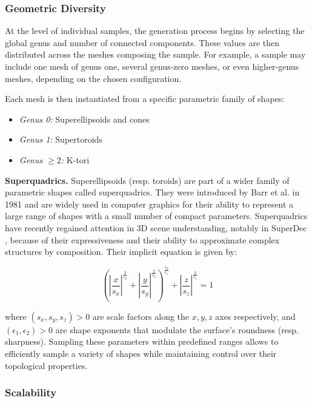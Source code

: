 \subsubsection{Geometric Diversity}
\label{sssec:sample-level-properties}

At the level of individual samples, the generation process begins by selecting the global genus and number of connected components. These values are then distributed across the meshes composing the sample. For example, a sample may include one mesh of genus one, several genus-zero meshes, or even higher-genus meshes, depending on the chosen configuration.

Each mesh is then instantiated from a specific parametric family of shapes:
\begin{itemize}
  \item \textit{Genus 0:} Superellipsoids and cones
  \item \textit{Genus 1:} Supertoroids
  \item \textit{Genus $\geq 2$:} K-tori
\end{itemize}

\textbf{Superquadrics.} Superellipsoids  (resp. toroids) are part of a wider family of parametric shapes called superquadrics. They were introduced by Barr et al. \cite{superquadrics} in 1981 and are widely used in computer graphics for their ability to represent a large range of shapes with a small number of compact parameters. Superquadrics have recently regained attention in 3D scene understanding, notably in SuperDec \cite{superdec}, because of their expressiveness and their ability to approximate complex structures by composition. Their implicit equation is given by:

\begin{equation}
\left( \left| \frac{x}{s_x} \right|^{\tfrac{2}{\epsilon_2}}
     + \left| \frac{y}{s_y} \right|^{\tfrac{2}{\epsilon_2}} \right)^{\tfrac{\epsilon_2}{\epsilon_1}}
+ \left| \frac{z}{s_z} \right|^{\tfrac{2}{\epsilon_1}}
= 1
\end{equation}

where $(s_x, s_y, s_z) > 0$ are scale factors along the $x, y, z$ axes respectively, and $(\epsilon_1, \epsilon_2) > 0$ are shape exponents that modulate the surface's roundness (resp. sharpness). Sampling these parameters within predefined ranges allows to efficiently sample a variety of shapes while maintaining control over their topological properties.

\subsubsection{Scalability}
\label{sssec:mesh-generation}

